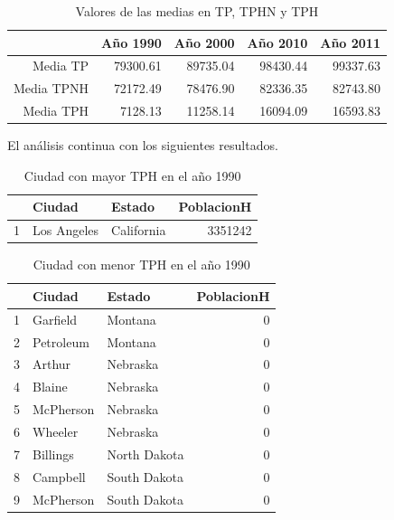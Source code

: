\begin{table}[ht]
\centering
\begin{tabular}{rrrrr}
  \hline
 & Año 1990 & Año 2000 & Año 2010 & Año 2011 \\ 
  \hline
Media TP & 79300.61 & 89735.04 & 98430.44 & 99337.63 \\ 
  Media TPNH & 72172.49 & 78476.90 & 82336.35 & 82743.80 \\ 
  Media TPH & 7128.13 & 11258.14 & 16094.09 & 16593.83 \\ 
   \hline
\end{tabular}
\caption{Valores de las medias en TP, TPHN y TPH} 
\end{table}



El análisis continua con los siguientes resultados.
\begin{table}[ht]
\centering
\begin{tabular}{rllr}
  \hline
 & Ciudad & Estado & PoblacionH \\ 
  \hline
1 & Los Angeles & California & 3351242 \\ 
   \hline
\end{tabular}
\caption{Ciudad con mayor TPH en el año 1990} 
\end{table}


\begin{table}[ht]
\centering
\begin{tabular}{rllr}
  \hline
 & Ciudad & Estado & PoblacionH \\ 
  \hline
1 & Garfield & Montana &   0 \\ 
  2 & Petroleum & Montana &   0 \\ 
  3 & Arthur & Nebraska &   0 \\ 
  4 & Blaine & Nebraska &   0 \\ 
  5 & McPherson & Nebraska &   0 \\ 
  6 & Wheeler & Nebraska &   0 \\ 
  7 & Billings & North Dakota &   0 \\ 
  8 & Campbell & South Dakota &   0 \\ 
  9 & McPherson & South Dakota &   0 \\ 
   \hline
\end{tabular}
\caption{Ciudad con menor TPH en el año 1990} 
\end{table}


